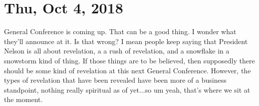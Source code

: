 \section{Thu, Oct 4, 2018}

General Conference is coming up. That can be a good thing. I wonder what they'll
announce at it. Is that wrong? I mean people keep saying that President Nelson is all
about revelation, a a rush of revelation, and a snowflake in a snowstorm kind of
thing. If those things are to be believed, then supposedly there should be some kind
of revelation at this next General Conference. However, the types of revelation that
have been revealed have been more of a business standpoint, nothing really spiritual
as of yet...so um yeah, that's where we sit at the moment.
